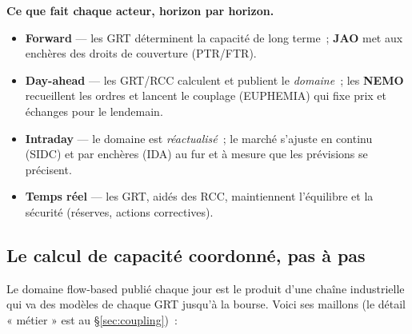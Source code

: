 \documentclass[11pt,a4paper]{article}
\newcommand{\RAM}{\mathrm{RAM}}
\newcommand{\Fmax}{F^{\max}}
\newcommand{\Fref}{F^{\mathrm{ref}}}
\newcommand{\FRM}{\mathrm{FRM}}
\begin{document}
\noindent\textbf{Ce que fait chaque acteur, horizon par horizon.}
\begin{itemize}[nosep,leftmargin=1.4em]
  \item \textbf{Forward} — les GRT déterminent la capacité de long terme~;
        \textbf{JAO} met aux enchères des droits de couverture (PTR/FTR).
  \item \textbf{Day-ahead} — les GRT/RCC calculent et publient le
        \emph{domaine}~; les \textbf{NEMO} recueillent les ordres et lancent
        le couplage (EUPHEMIA) qui fixe prix et échanges pour le lendemain.
  \item \textbf{Intraday} — le domaine est \emph{réactualisé}~; le marché
        s'ajuste en continu (SIDC) et par enchères (IDA) au fur et à mesure
        que les prévisions se précisent.
  \item \textbf{Temps réel} — les GRT, aidés des RCC, maintiennent
        l'équilibre et la sécurité (réserves, actions correctives).
\end{itemize}

\subsection{Le calcul de capacité coordonné, pas à pas}
\label{sec:cccpasapas}

Le domaine flow-based publié chaque jour est le produit d'une chaîne
industrielle qui va des modèles de chaque GRT jusqu'à la bourse. Voici ses
maillons (le détail « métier » est au \S\ref{sec:coupling})~:

\begin{center}
\end{center}
\end{document}

